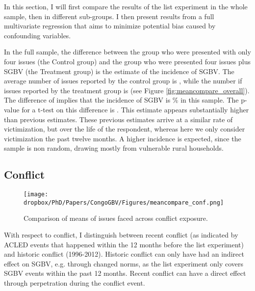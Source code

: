 In this section, I will first compare the results of the list experiment in the whole sample, then in different sub-groups. I then present results from a full multivariate regression that aims to minimize potential bias caused by confounding variables. 

In the full sample, the difference between the group who were presented with only four issues (the Control group) and the group who were presented four issues plus SGBV (the Treatment group) is the estimate of the incidence of SGBV. The average number of issues reported by the control group is , while the number if issues reported by the treatment group is  (see Figure \ref{fig:meancompare_overall}). The difference of  implies that the incidence of SGBV is \% in this sample. The p-value for a t-test on this difference is . This estimate appears substantially higher than previous estimates. These previous estimates \citep[e.g.][]{Peterson2018,Stark2017,Johnson2010} arrive at a similar rate of victimization, but over the life of the respondent, whereas here we only consider victimization the past twelve months. A higher incidence is expected, since the sample is non random, drawing mostly from vulnerable rural households. 

\subsection{Conflict} 

\begin{figure}[htb]
  \texttt{[image: \\dropbox/PhD/Papers/CongoGBV/Figures/meancompare\_conf.png]}
  \caption{Comparison of means of issues faced across conflict exposure.}
  \label{fig:meancompare_conf}
\end{figure}

With respect to conflict, I distinguish between recent conflict (as indicated by ACLED events that happened within the 12 months before the list experiment) and historic conflict (1996-2012). Historic conflict can only have had an indirect effect on SGBV, e.g. through changed norms, as the list experiment only covers SGBV events within the past 12 months. Recent conflict can have a direct effect through perpetration during the conflict event. 

